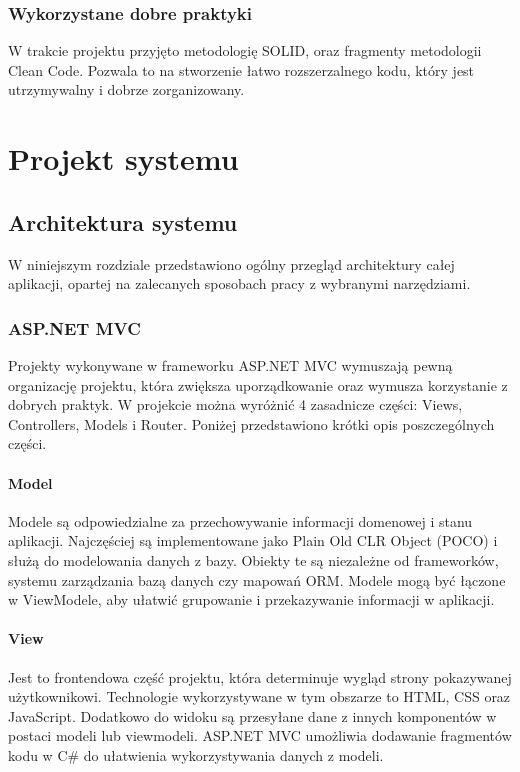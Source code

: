 \documentclass{article}
\begin{document}
\subsubsection{Wykorzystane dobre praktyki}

W trakcie projektu przyjęto metodologię SOLID, oraz fragmenty metodologii Clean Code. Pozwala to na stworzenie łatwo rozszerzalnego kodu, który jest utrzymywalny i dobrze zorganizowany.

\section{Projekt systemu}

\subsection{Architektura systemu}

W niniejszym rozdziale przedstawiono ogólny przegląd architektury całej aplikacji, opartej na zalecanych sposobach pracy z wybranymi narzędziami.

\subsubsection{ASP.NET MVC}

Projekty wykonywane w frameworku ASP.NET MVC wymuszają pewną organizację projektu, która zwiększa uporządkowanie oraz wymusza korzystanie z dobrych praktyk. W projekcie można wyróżnić 4 zasadnicze części: Views, Controllers, Models i Router. Poniżej przedstawiono krótki opis poszczególnych części.

\paragraph{Model}
Modele są odpowiedzialne za przechowywanie informacji domenowej i stanu aplikacji. Najczęściej są implementowane jako Plain Old CLR Object (POCO) i służą do modelowania danych z bazy. Obiekty te są niezależne od frameworków, systemu zarządzania bazą danych czy mapowań ORM. Modele mogą być łączone w ViewModele, aby ułatwić grupowanie i przekazywanie informacji w aplikacji.

\paragraph{View}
Jest to frontendowa część projektu, która determinuje wygląd strony pokazywanej użytkownikowi. Technologie wykorzystywane w tym obszarze to HTML, CSS oraz JavaScript. Dodatkowo do widoku są przesyłane dane z innych komponentów w postaci modeli lub viewmodeli. ASP.NET MVC umożliwia dodawanie fragmentów kodu w C\# do ułatwienia wykorzystywania danych z modeli.
\end{document}
